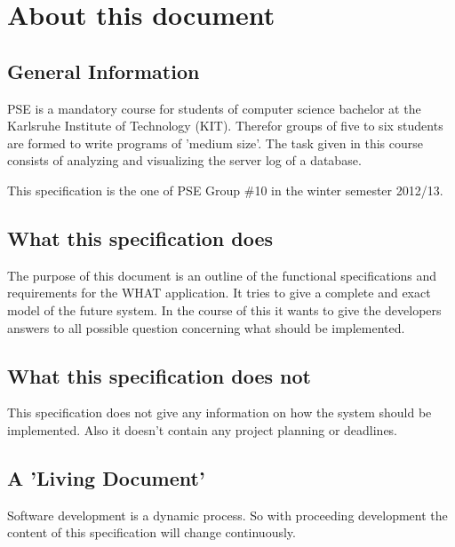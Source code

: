 \section*{About this document}

\subsection*{General Information}
\gls{PSE} is a mandatory course for students of computer science bachelor at the %
Karlsruhe Institute of Technology (\gls{KIT}). Therefor groups of five to six
students are formed to write programs of 'medium size'. 
The task given in this course consists of analyzing and visualizing the server log of a \gls{database}.

This specification is the one of \gls{PSE} Group \#10 in the winter semester 2012/13.


\subsection*{What this specification does}
The purpose of this document is an outline of the functional specifications and requirements
for the WHAT application. It tries to give a complete and exact model of the future system.
In the course of this it wants to give the developers answers to all possible question concerning
what should be implemented.


\subsection*{What this specification does not}
This specification does not give any information on how the system should be implemented. 
Also it doesn't contain any project planning or deadlines.


\subsection*{A 'Living Document'}
Software development is a dynamic process. So with proceeding development the
content of this specification will change continuously. 


